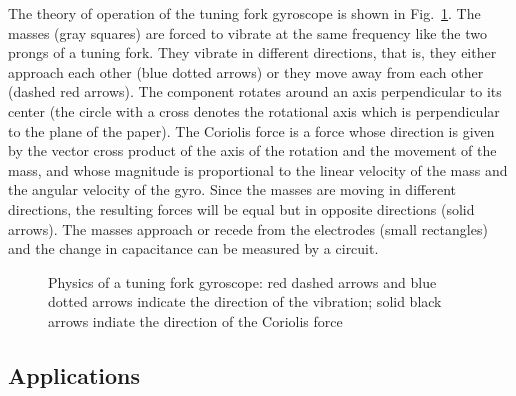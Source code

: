 The theory of operation of the tuning fork gyroscope is shown in Fig.~\ref{fig.tuning-gyro}. The masses (gray squares) are forced to vibrate at the same frequency like the two prongs of a tuning fork. They vibrate in different directions, that is, they either approach each other (blue dotted arrows) or they move away from each other (dashed red arrows). The component rotates around an axis perpendicular to its center (the circle with a cross denotes the rotational axis which is perpendicular to the plane of the paper). The Coriolis force is a force whose direction is given by the vector cross product of the axis of the rotation and the movement of the mass, and whose magnitude is proportional to the linear velocity of the mass and the angular velocity of the gyro. Since the masses are moving in different directions, the resulting forces will be equal but in opposite directions (solid arrows). The masses approach or recede from the electrodes (small rectangles) and the change in capacitance can be measured by a circuit.

\begin{figure}
\begin{center}
\end{center}
\caption{Physics of a tuning fork gyroscope: red dashed arrows and blue dotted arrows indicate the direction of the vibration; solid black arrows indiate the direction of the Coriolis force}\label{fig.tuning-gyro}
\end{figure}

\subsection{Applications}

